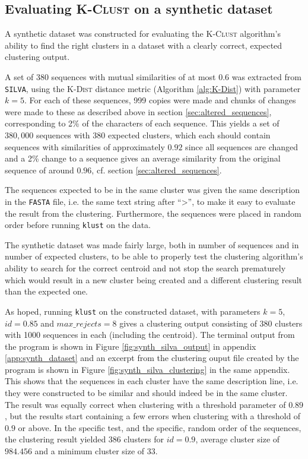 

\subsection{Evaluating \textsc{K-Clust} on a synthetic dataset}
\label{sec:synth_dataset}

A synthetic dataset was constructed for evaluating the \textsc{K-Clust}
algorithm's ability to find the right clusters in a dataset with a clearly
correct, expected clustering output.

A set of 380 sequences with mutual similarities of at most 0.6 was extracted
from \texttt{SILVA}, using the \textsc{K-Dist} distance metric (Algorithm
\ref{alg:K-Dist}) with parameter $k=5$. For each of these sequences, 999 copies
were made and chunks of changes were made to these as described above in
section \ref{sec:altered_sequences}, corresponding to 2\% of the characters of
each sequence. This yields a set of $380,000$ sequences with 380 expected
clusters, which each should contain sequences with similarities of
approximately $0.92$ since all sequences are changed and a 2\% change to a
sequence gives an average similarity from the original sequence of around
$0.96$, cf. section \ref{sec:altered_sequences}.

The sequences expected to be in the same cluster was given the same description
in the \texttt{FASTA} file, i.e. the same text string after ``>'', to make it
easy to evaluate the result from the clustering. Furthermore, the sequences
were placed in random order before running \texttt{klust} on the data.

The synthetic dataset was made fairly large, both in number of sequences and in
number of expected clusters, to be able to properly test the clustering
algorithm's ability to search for the correct centroid and not stop the search
prematurely which would result in a new cluster being created and a different
clustering result than the expected one.

As hoped, running \texttt{klust} on the constructed dataset, with parameters
$k=5$, $id=0.85$ and $max\_rejects=8$ gives a clustering output consisting of
380 clusters with 1000 sequences in each (including the centroid). The terminal
output from the program is shown in Figure \ref{fig:synth_silva_output} in
appendix \ref{app:synth_dataset} and an excerpt from the clustering ouput file
created by the program is shown in Figure \ref{fig:synth_silva_clustering} in
the same appendix. This shows that the sequences in each cluster have the same
description line, i.e. they were constructed to be similar and should indeed be
in the same cluster. The result was equally correct when clustering with a
threshold parameter of $0.89$, but the results start containing a few errors
when clustering with a threshold of $0.9$ or above. In the specific test, and
the specific, random order of the sequences, the clustering result yielded 386
clusters for $id=0.9$, average cluster size of $984.456$ and a minimum cluster
size of $33$.


